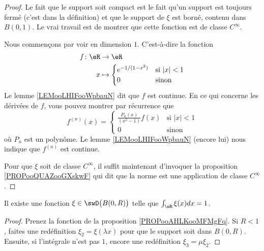 \begin{proof}
	Le fait que le support soit compact est le fait qu'un support est toujours fermé (c'est dans la définition) et que le support de \( \xi\) est borné, contenu dans \( B(0,1)\). Le vrai travail est de montrer que cette fonction est de classe \(  C^{\infty}\).

	Nous commençons par voir en dimension \( 1\). C'est-à-dire la fonction
	\begin{equation}
		\begin{aligned}
			f\colon \eR & \to \eR                                     \\
			x           & \mapsto \begin{cases}
				                      e^{-1/(1-x^2)} & \text{si } | x |<1 \\
				                      0              & \text{sinon }
			                      \end{cases}
		\end{aligned}
	\end{equation}
	Le lemme \ref{LEMooLHIFooWpbauN} dit que \( f\) est continue. En ce qui concerne les dérivées de \( f\), vous pouvez montrer par récurrence que
	\begin{equation}
		f^{(n)}(x)=\begin{cases}
			\frac{ P_n(x) }{ (x^2-1) }f(x) & \text{si } | x |<1 \\
			0                              & \text{sinon }
		\end{cases}
	\end{equation}
	où \( P_n\) est un polynôme. Le lemme \ref{LEMooLHIFooWpbauN} (encore lui) nous indique que \( f^{(n)}\) est continue.

	Pour que \( \xi\) soit de classe \(  C^{\infty}\), il suffit maintenant d'invoquer la proposition \ref{PROPooQUAZooGXskwF} qui dit que la norme est une application de classe \(  C^{\infty}\).
\end{proof}

\begin{corollary}       \label{CORooHHZXooXmwGmC}
	Il existe une fonction \( \xi\in\swD\big( B(0,R) \big)\) telle que \( \int_{\eR}\xi(x)dx=1\).
\end{corollary}

\begin{proof}
	Prenez la fonction de la proposition \ref{PROPooAHLKooMFMgFq}. Si \( R<1\), faites une redéfinition \( \xi_2=\xi(\lambda x)\) pour que le support soit dans \( B(0,R)\). Ensuite, si l'intégrale n'est pas \( 1\), encore une redéfinition \( \xi_3=\mu\xi_2\).
\end{proof}


